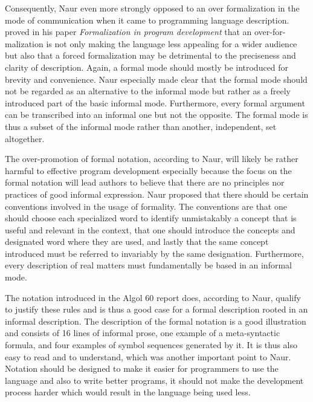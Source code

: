 \documentclass{article}
\begin{document}
Consequently, Naur even more strongly opposed to an over formalization in the mode of communication when it came to programming language description. \cite{naur1982formalization} proved in his paper \textit{Formalization in program development} that an over-for- malization is not only making the language less appealing for a wider audience but also that a forced formalization may be detrimental to the preciseness and clarity of description. Again, a formal mode should mostly be introduced for brevity and convenience. Naur especially made clear that the formal mode should not be regarded as an alternative to the informal mode but rather as a freely introduced part of the basic informal mode. Furthermore, every formal argument can be transcribed into an informal one but not the opposite. The formal mode is thus a subset of the informal mode rather than another, independent, set altogether. 

The over-promotion of formal notation, according to Naur, will likely be rather harmful to effective program development especially because the focus on the formal notation will lead authors to believe that there are no principles nor practices of good informal expression. Naur proposed that there should be certain conventions involved in the usage of formality. The conventions are that one should choose each specialized word to identify unmistakably a concept that is useful and relevant in the context, that one should introduce the concepts and designated word where they are used, and lastly that the same concept introduced must be referred to invariably by the same designation. Furthermore, every description of real matters must fundamentally be based in an informal mode.

The notation introduced in the Algol 60 report does, according to Naur, qualify to justify these rules and is thus a good case for a formal description rooted in an informal description. The description of the formal notation is a good illustration and consists of 16 lines of informal prose, one example of a meta-syntactic formula, and four examples of symbol sequences generated by it. It is thus also easy to read and to understand, which was another important point to Naur. Notation should be designed to make it easier for programmers to use the language and also to write better programs, it should not make the development process harder which would result in the language being used less.
\end{document}
